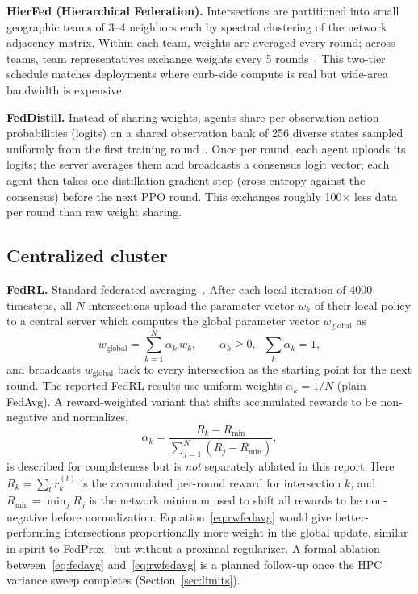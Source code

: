 \documentclass[conference]{IEEEtran}
\begin{document}
\textbf{HierFed (Hierarchical Federation).} Intersections are partitioned into small geographic teams of 3--4 neighbors each by spectral clustering of the network adjacency matrix. Within each team, weights are averaged every round; across teams, team representatives exchange weights every 5 rounds~\cite{fu2025hierfed}. This two-tier schedule matches deployments where curb-side compute is real but wide-area bandwidth is expensive.

\textbf{FedDistill.} Instead of sharing weights, agents share per-observation action probabilities (logits) on a shared observation bank of 256 diverse states sampled uniformly from the first training round~\cite{jeong2018feddistill}. Once per round, each agent uploads its logits; the server averages them and broadcasts a consensus logit vector; each agent then takes one distillation gradient step (cross-entropy against the consensus) before the next PPO round. This exchanges roughly 100$\times$ less data per round than raw weight sharing.

\subsection{Centralized cluster}
\textbf{FedRL.} Standard federated averaging~\cite{mcmahan2017fedavg}. After each local iteration of 4000 timesteps, all $N$ intersections upload the parameter vector $w_k$ of their local policy to a central server which computes the global parameter vector $w_{\text{global}}$ as
\begin{equation}
w_{\text{global}} = \sum_{k=1}^{N} \alpha_k \, w_k, \qquad \alpha_k \ge 0, \;\; \sum_{k} \alpha_k = 1, \label{eq:fedavg}
\end{equation}
and broadcasts $w_{\text{global}}$ back to every intersection as the starting point for the next round. The reported FedRL results use uniform weights $\alpha_k = 1/N$ (plain FedAvg). A reward-weighted variant that shifts accumulated rewards to be non-negative and normalizes,
\begin{equation}
\alpha_k = \frac{R_k - R_{\min}}{\sum_{j=1}^{N} (R_j - R_{\min})}, \label{eq:rwfedavg}
\end{equation}
is described for completeness but is \emph{not} separately ablated in this report. Here $R_k = \sum_t r_k^{(t)}$ is the accumulated per-round reward for intersection $k$, and $R_{\min} = \min_j R_j$ is the network minimum used to shift all rewards to be non-negative before normalization. Equation~\eqref{eq:rwfedavg} would give better-performing intersections proportionally more weight in the global update, similar in spirit to FedProx~\cite{li2020fedprox} but without a proximal regularizer. A formal ablation between~\eqref{eq:fedavg} and~\eqref{eq:rwfedavg} is a planned follow-up once the HPC variance sweep completes (Section~\ref{sec:limits}).
\end{document}
